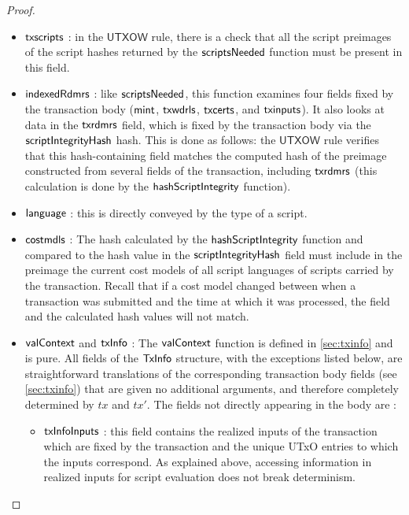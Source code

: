 \begin{property}
\begin{proof}
\begin{itemize}
      \item $\mathsf{txscripts}$ : in the $\mathsf{UTXOW}$ rule, there is a check that all the
      script preimages of the script hashes returned by the $\mathsf{scriptsNeeded}$
      function must be present in this field.

      \item $\mathsf{indexedRdmrs}$ : like $\mathsf{scriptsNeeded}$, this function
      examines four fields fixed by the transaction body ($\mathsf{mint}$, $\mathsf{txwdrls}$,
      $\mathsf{txcerts}$, and $\mathsf{txinputs}$).
      It also looks at data in the $\mathsf{txrdmrs}$ field, which is fixed
      by the transaction body via the $\mathsf{scriptIntegrityHash}$
      hash. This is done as follows: the $\mathsf{UTXOW}$ rule verifies that this
      hash-containing field matches the computed hash
      of the preimage constructed from several fields of the transaction,
      including $\mathsf{txrdmrs}$ (this calculation
      is done by the $\mathsf{hashScriptIntegrity}$ function).

      \item $\mathsf{language}$ : this is directly conveyed by the type of a script.

      \item $\mathsf{costmdls}$ : The hash calculated by the $\mathsf{hashScriptIntegrity}$
      function and compared to the hash value in the $\mathsf{scriptIntegrityHash}$ field
      must include in the preimage the current cost models of
      all script languages of scripts carried by the transaction. Recall that
      if a cost model changed between when a transaction was submitted and the
      time at which it was processed, the field and the calculated hash values
      will not match.

      \item $\mathsf{valContext}$ and $\mathsf{txInfo}$ :
      The $\mathsf{valContext}$ function is defined in \ref{sec:txinfo} and is pure.
      All fields of the $\mathsf{TxInfo}$
      structure, with the exceptions listed below,
      are straightforward translations of the corresponding transaction body fields (see \ref{sec:txinfo}) that
      are given no additional arguments,
      and therefore completely determined by $tx$ and $tx'$. The fields not directly
      appearing in the body are :

      \begin{itemize}
        \item $\mathsf{txInfoInputs}$ : this field contains the realized inputs of
        the transaction which are fixed by the transaction and the unique
        UTxO entries to which the inputs correspond. As explained above,
        accessing information in realized inputs for script evaluation
        does not break determinism.


\end{itemize}
\end{itemize}
\end{proof}
\end{property}
